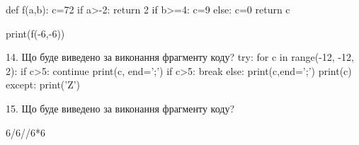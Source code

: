 \documentclass[11pt]{article}
\begin{document}
def f(a,b):
    c=72
    if a>-2:
        return 2
    if b>=4:
         c=9
    else: 
        c=0
    return c

print(f(-6,-6))

14. Що буде виведено за виконання фрагменту коду?
try:
    for c in range(-12, -12, 2):
        if c>5:
            continue
        print(c, end=';')
        if c>5:
            break
    else:
        print(c,end=';')
    print(c)
except:
    print('Z')

15. Що буде виведено за виконання фрагменту коду?

6/6//6*6
















\newpage
\end{document}
